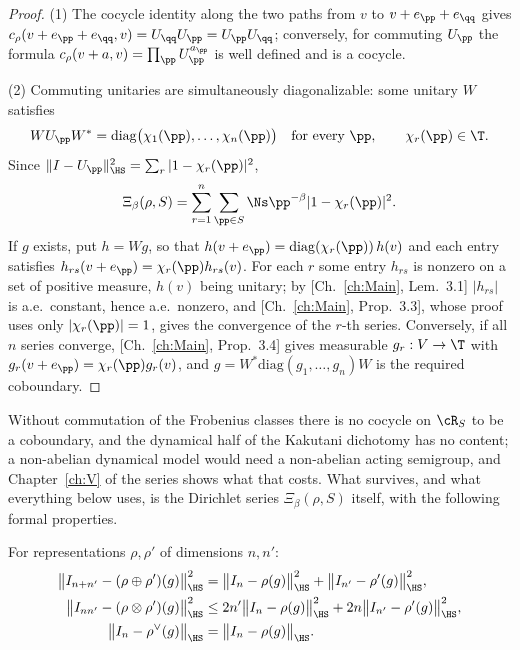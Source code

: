 \begin{proof}
(1) The cocycle identity along the two paths from $v$ to $v+e_\pp+e_\qq$ gives
$c_\rho(v+e_\pp+e_\qq,v)=U_\qq U_\pp=U_\pp U_\qq$; conversely, for commuting $U_\pp$ the
formula $c_\rho(v+a,v)=\prod_\pp U_\pp^{a_\pp}$ is well defined and is a cocycle.

(2) Commuting unitaries are simultaneously diagonalizable: some unitary $W$ satisfies
\[
WU_\pp W^*=\mathrm{diag}\bigl(\chi_1(\pp),\dots,\chi_n(\pp)\bigr)\quad\text{for every }\pp,
\qquad\chi_r(\pp)\in\T .
\] Since $\|I-U_\pp\|_{\HS}^2=\sum_r|1-\chi_r(\pp)|^2$,
\[
\Xi_\beta(\rho,S)=\sum_{r=1}^n\sum_{\pp\in S}\Ns\pp^{-\beta}|1-\chi_r(\pp)|^2 .
\]
If $g$ exists, put $h=Wg$, so that $h(v+e_\pp)=\mathrm{diag}(\chi_r(\pp))\,h(v)$ and each
entry satisfies $h_{rs}(v+e_\pp)=\chi_r(\pp)h_{rs}(v)$. For each $r$ some entry $h_{rs}$ is
nonzero on a set of positive measure, $h(v)$ being unitary; by [Ch.~\ref{ch:Main}, Lem.~3.1]
$|h_{rs}|$ is a.e.\ constant, hence a.e.\ nonzero, and [Ch.~\ref{ch:Main}, Prop.~3.3], whose proof
uses only $|\chi_r(\pp)|=1$, gives the convergence of the $r$-th series. Conversely,
if all $n$ series converge, [Ch.~\ref{ch:Main}, Prop.~3.4] gives measurable $g_r:V\to\T$ with
$g_r(v+e_\pp)=\chi_r(\pp)g_r(v)$, and $g=W^*\mathrm{diag}(g_1,\dots,g_n)W$ is the required
coboundary.
\end{proof}

\begin{remark}\label{VI:rem:primary}
Without commutation of the Frobenius classes there is no cocycle on $\cR_S$ to be a
coboundary, and the dynamical half of the Kakutani dichotomy has no content; a
non-abelian dynamical model would need a non-abelian acting semigroup, and Chapter~\ref{ch:V} of the
series shows what that costs. What survives, and what everything below uses, is the
Dirichlet series $\Xi_\beta(\rho,S)$ itself, with the following formal properties.
\end{remark}

\begin{lemma}\label{VI:lem:additivity}
For representations $\rho,\rho'$ of dimensions $n,n'$:
\begin{align}
\bigl\|I_{n+n'}-(\rho\oplus\rho')(g)\bigr\|_{\HS}^2&=\bigl\|I_n-\rho(g)\bigr\|_{\HS}^2+\bigl\|I_{n'}-\rho'(g)\bigr\|_{\HS}^2, \label{VI:eq:oplus}\\
\bigl\|I_{nn'}-(\rho\otimes\rho')(g)\bigr\|_{\HS}^2&\le2n'\bigl\|I_n-\rho(g)\bigr\|_{\HS}^2+2n\bigl\|I_{n'}-\rho'(g)\bigr\|_{\HS}^2, \label{VI:eq:otimes}\\
\bigl\|I_n-\rho^\vee(g)\bigr\|_{\HS}&=\bigl\|I_n-\rho(g)\bigr\|_{\HS}. \label{VI:eq:dual}
\end{align}
\end{lemma}


